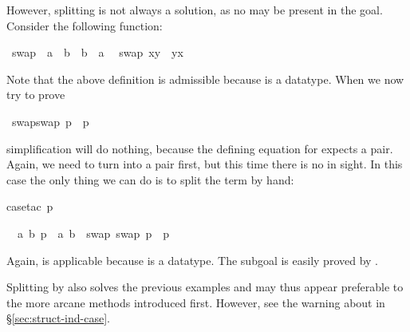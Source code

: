 \begin{isabellebody}
\begin{isamarkuptxt}
However, splitting  is not always a solution, as no 
may be present in the goal. Consider the following function:%
\end{isamarkuptxt}%
\isamarkuptrue%
\isamarkupfalse%
\ swap\ {\isacharcolon}{\isacharcolon}\ {\isachardoublequote}{\isacharprime}a\ {\isasymtimes}\ {\isacharprime}b\ {\isasymRightarrow}\ {\isacharprime}b\ {\isasymtimes}\ {\isacharprime}a{\isachardoublequote}\isanewline
\isamarkupfalse%
\isanewline
\ \ {\isachardoublequote}swap\ {\isacharparenleft}x{\isacharcomma}y{\isacharparenright}\ {\isacharequal}\ {\isacharparenleft}y{\isacharcomma}x{\isacharparenright}{\isachardoublequote}\isamarkupfalse%
%
\begin{isamarkuptext}%
\noindent
Note that the above  definition is admissible
because \isa{{\isasymtimes}} is a datatype. When we now try to prove%
\end{isamarkuptext}%
\isamarkuptrue%
\ {\isachardoublequote}swap{\isacharparenleft}swap\ p{\isacharparenright}\ {\isacharequal}\ p{\isachardoublequote}\isamarkupfalse%
%
\begin{isamarkuptxt}%
\noindent
simplification will do nothing, because the defining equation for 
expects a pair. Again, we need to turn  into a pair first, but this
time there is no  in sight. In this case the only thing we can do
is to split the term by hand:%
\end{isamarkuptxt}%
\isamarkuptrue%
case{\isacharunderscore}tac\ p{\isacharparenright}\isamarkupfalse%
%
\begin{isamarkuptxt}%
\noindent
\begin{isabelle}%
\ {}{\isachardot}\ {\isasymAnd}a\ b{\isachardot}\ p\ {\isacharequal}\ {\isacharparenleft}a{\isacharcomma}\ b{\isacharparenright}\ {\isasymLongrightarrow}\ swap\ {\isacharparenleft}swap\ p{\isacharparenright}\ {\isacharequal}\ p%
\end{isabelle}
Again,  is applicable because \isa{{\isasymtimes}} is a datatype.
The subgoal is easily proved by .

Splitting by  also solves the previous examples and may thus
appear preferable to the more arcane methods introduced first. However, see
the warning about  in \S\ref{sec:struct-ind-case}.


\end{isamarkuptxt}
\end{isabellebody}
